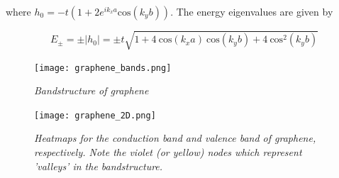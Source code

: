 where $h_{0} = -t(1+2e^{ik_{x}a}\text{cos}(k_{y}b))$. The energy eigenvalues are given by 

\begin{equation}
    E_{\pm} = \pm |h_{0}| = \pm t\sqrt{1 + 4\:\text{cos}(k_{x}a)\:\text{cos}(k_{y}b) + 4\:\text{cos}^{2}(k_{y}b)}
\end{equation}

\begin{figure}[!htbp]
\centering
\texttt{[image: graphene\_bands.png]}
\caption{\textit{Bandstructure of graphene}}
\vspace{12pt}
\texttt{[image: graphene\_2D.png]}
\caption{\textit{Heatmaps for the conduction band and valence band of graphene, respectively. Note the violet (or yellow) nodes which represent 'valleys' in the bandstructure.}}
\end{figure}